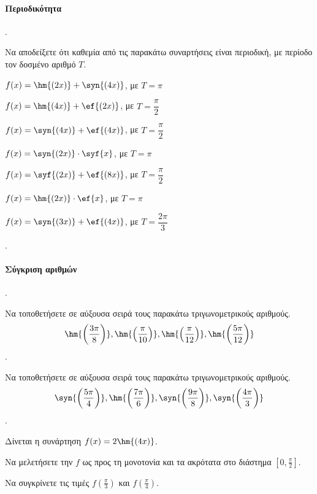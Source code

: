 \documentclass[11pt,a4paper,twocolumn]{article}
\newcounter{askhsh}
\newcommand{\askhsh}{{\large\theaskhsh.}\ \addtocounter{askhsh}{1}}
\begin{document}
\paragraph{Περιοδικότητα}
\askhsh Να αποδείξετε ότι καθεμία από τις παρακάτω συναρτήσεις είναι περιοδική, με περίοδο τον δοσμένο αριθμό $T$.
\begin{alist}
\item $f(x)=\hm{(2x)}+\syn{(4x)}$, με $T=\pi$
\item $f(x)=\hm{(4x)}+\ef{(2x)}$, με $T=\dfrac{\pi}{2}$
\item $f(x)=\syn{(4x)}+\ef{(4x)}$, με $T=\dfrac{\pi}{2}$
\item $f(x)=\syn{(2x)}\cdot\syf{x}$, με $T=\pi$
\item $f(x)=\syf{(2x)}+\ef{(8x)}$, με $T=\dfrac{\pi}{2}$
\item $f(x)=\hm{(2x)}\cdot\ef{x}$, με $T=\pi$
\item $f(x)=\syn{(3x)}+\ef{(4x)}$, με $T=\dfrac{2\pi}{3}$
\end{alist}
\askhsh
\paragraph{Σύγκριση αριθμών}
\askhsh Να τοποθετήσετε σε αύξουσα σειρά τους παρακάτω τριγωνομετρικούς αριθμούς.
\[ \hm{\left(\dfrac{3\pi}{8}\right)},\hm{\left(\dfrac{\pi}{10}\right)},\hm{\left(\dfrac{\pi}{12}\right)},\hm{\left(\dfrac{5\pi}{12}\right)} \]
\askhsh Να τοποθετήσετε σε αύξουσα σειρά τους παρακάτω τριγωνομετρικούς αριθμούς.
\[ \syn{\left(\dfrac{5\pi}{4}\right)},\hm{\left(\dfrac{7\pi}{6}\right)},\syn{\left(\dfrac{9\pi}{8}\right)},\syn{\left(\dfrac{4\pi}{3}\right)} \]
\askhsh Δίνεται η συνάρτηση $f(x)=2\hm{(4x)}$.
\begin{alist}
\item Να μελετήσετε την $f$ ως προς τη μονοτονία και τα ακρότατα στο διάστημα $\left[0,\frac{\pi}{2}\right]$.
\item Να συγκρίνετε τις τιμές $f\left(\frac{\pi}{3}\right)$ και $f\left(\frac{\pi}{4}\right)$.
\end{alist}
\end{document}

